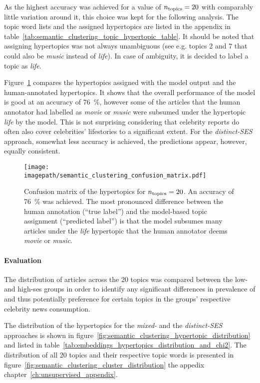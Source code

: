 As the highest accuracy was achieved for a value of $n_\text{topics}=20$ with comparably little variation around it, this choice was kept for the following analysis. The topic word lists and the assigned hypertopics are listed in the appendix in table~\ref{tab:semantic_clustering_topic_hypertopic_table}. It should be noted that assigning hypertopics was not always unambiguous (see e.g. topics 2 and 7 that could also be \textit{music} instead of \textit{life}). In case of ambiguity, it is decided to label a topic as \textit{life}.

Figure~\ref{fig:embedding_confusion_matrix} compares the hypertopics assigned with the model output and the human-annotated hypertopics. It shows that the overall performance of the model is good at an accuracy of \SI{76}{\percent}, however some of the articles that the human annotator had labelled as \textit{movie} or \textit{music} were subsumed under the hypertopic \textit{life} by the model. This is not surprising considering that celebrity reports do often also cover celebrities' lifestories to a significant extent. For the \textit{distinct-SES} approach, somewhat less accuracy is achieved, the predictions appear, however, equally consistent.

\begin{figure}
    \centering
    \texttt{[image: \\imagepath/semantic\_clustering\_confusion\_matrix.pdf]}
    \caption{Confusion matrix of the hypertopics for $n_\text{topics}=20$. An accuracy of \SI{76}{\percent} was achieved. The most pronounced difference between the human annotation (``true label'') and the model-based topic assignment (``predicted label'') is that the model subsumes many articles under the \textit{life} hypertopic that the human annotator deems \textit{movie} or \textit{music}.}\label{fig:embedding_confusion_matrix}
\end{figure}

\paragraph{Evaluation}
The distribution of articles across the \SI{20}{} topics was compared between the low- and high-\gls{ses} groups in order to identify any significant differences in prevalence of and thus potentially preference for certain topics in the groups' respective celebrity news consumption.

The distribution of the hypertopics for the \textit{mixed-} and the \textit{distinct-SES} approaches is shown in figure~\ref{fig:semantic_clustering_hypertopic_distribution} and listed in table~\ref{tab:embeddings_hypertopics_distribution_and_chi2}. The distribution of all \SI{20}{} topics and their respective topic words is presented in figure~\ref{fig:semantic_clustering_cluster_distribution} the appedix chapter~\ref{ch:unsupervised_appendix}.

